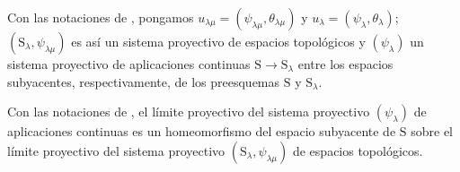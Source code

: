 \begin{env}[8.2.8]
\label{IV.8.2.8}
Con las notaciones de , pongamos $u_{\lambda\mu}=(\psi_{\lambda\mu},\theta_{\lambda\mu})$ y $u_\lambda=(\psi_\lambda,\theta_\lambda)$; $(\mathrm{S}_\lambda,\psi_{\lambda\mu})$ es así un sistema proyectivo de espacios topológicos y $(\psi_\lambda)$ un sistema proyectivo de aplicaciones continuas $\mathrm{S}\to\mathrm{S}_\lambda$ entre los espacios subyacentes, respectivamente, de los preesquemas $\mathrm{S}$ y $\mathrm{S}_\lambda$.
\end{env}

\begin{proposition}[8.2.9]
\label{IV.8.2.9}
Con las notaciones de , el límite proyectivo del sistema proyectivo $(\psi_\lambda)$ de aplicaciones continuas es un homeomorfismo del espacio subyacente de $\mathrm{S}$ sobre el límite proyectivo del sistema proyectivo $(\mathrm{S}_\lambda,\psi_{\lambda\mu})$ de espacios topológicos.
\end{proposition}

